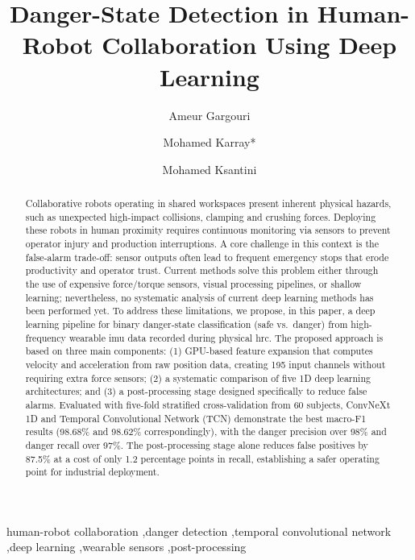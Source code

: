 \documentclass[3p,times,procedia]{elsarticle}
\begin{document}
\begin{frontmatter}


    \title{Danger-State Detection in Human-Robot Collaboration Using Deep Learning}

    \author[a,b]{Ameur Gargouri}
    \author[b]{Mohamed Karray*}
    \author[a]{Mohamed Ksantini}

    \address[a]{ATISP Lab, ENET'Com, University of Sfax, Sfax, Tunisia}
    \address[b]{ESME Research Lab, Ivry-sur-Seine, France}
    \begin{abstract}
        Collaborative robots operating in shared workspaces present inherent physical hazards, such as unexpected high-impact collisions, clamping and crushing forces. Deploying these robots in human proximity requires continuous monitoring via sensors to prevent operator injury and production interruptions. A core challenge in this context is the false-alarm trade-off: sensor outputs often lead to frequent emergency stops that erode productivity and operator trust. Current methods solve this problem either through the use of expensive force/torque sensors, visual processing pipelines, or shallow learning; nevertheless, no systematic analysis of current deep learning methods has been performed yet. To address these limitations, we propose, in this paper, a deep learning pipeline for binary danger-state classification (safe vs.\ danger) from high-frequency wearable \ac{imu} data recorded during physical \ac{hrc}.  The proposed approach is based on three main components: (1) GPU-based feature expansion
        that computes velocity and acceleration from raw position data, creating 195 input channels without requiring extra
        force sensors; (2) a systematic comparison of five 1D deep learning architectures; and (3) a post-processing stage
        designed specifically to reduce false alarms. Evaluated with five-fold stratified cross-validation from 60 subjects, ConvNeXt 1D and Temporal Convolutional Network (TCN) demonstrate the best macro-F1 results (98.68\% and 98.62\% correspondingly), with the danger precision over 98\% and danger recall over 97\%. The post-processing stage alone reduces false positives by 87.5\% at a cost of only 1.2 percentage points in recall, establishing a safer operating point for industrial deployment.
    \end{abstract}

    \begin{keyword}
        human-robot collaboration \sep danger detection \sep temporal convolutional network \sep deep learning \sep wearable sensors \sep post-processing
    \end{keyword}

\end{frontmatter}
\end{document}
